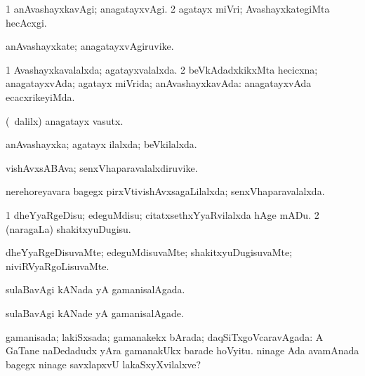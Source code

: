 \bentry
{} 
\gl{\kirxvi}
\expl{}
\bmng
\bnum
\num{1} anAvashayxkavAgi; anagatayxvAgi. 
\num{2} agatayx miVri; AvashayxkategiMta hecAcxgi. 
\enum
\emng
\eentry

\bentry
{} 
\gl{\nA}
\expl{}
\bmng
anAvashayxkate; anagatayxvAgiruvike. 
\emng
\eentry

\bentry
{} 
\gl{\gu}
\expl{}
\bmng
\bnum
\num{1} Avashayxkavalalxda; agatayxvalalxda. 
\num{2} beVkAdadxkikxMta hecicxna; anagatayxvAda; agatayx miVrida; anAvashayxkavAda:  anagatayxvAda ecacxrikeyiMda. 
\enum
\emng
\eentry

\bentry
{} 
\gl{\nA}
\bmng
(\sA\ \bava dalilx) anagatayx vasutx. 
\emng
\eentry

\bentry
{} 
\gl{\gu}
\bmng
anAvashayxka; agatayx ilalxda; beVkilalxda. 
\emng
\eentry

\bentry
{} 
\gl{\nA}
\expl{}
\bmng
vishAvxsABAva; senxVhaparavalalxdiruvike. 
\emng
\eentry

\bentry
{} 
\gl{\gu}
\expl{}
\bmng
nerehoreyavara bagegx pirxVtivishAvxsagaLilalxda; senxVhaparavalalxda. 
\emng
\eentry

\bentry
{} 
\gl{\sakirx}
\expl{}
\bmng
\bnum
\num{1} dheYyaRgeDisu; edeguMdisu; citatxsethxYyaRvilalxda hAge mADu. 
\num{2} (naragaLa) shakitxyuDugisu. 
\enum
\emng
\eentry

\bentry
{} 
\gl{\kirxvi}
\expl{}
\bmng
dheYyaRgeDisuvaMte; edeguMdisuvaMte; shakitxyuDugisuvaMte; niviRVyaRgoLisuvaMte. 
\emng
\eentry

\bentry
{} 
\gl{\gu}
\expl{}
\bmng
sulaBavAgi kANada yA gamanisalAgada. 
\emng
\eentry

\bentry
{} 
\gl{\kirxvi}
\expl{}
\bmng
sulaBavAgi kANade yA gamanisalAgade. 
\emng
\eentry

\bentry
{} 
\gl{\gu}
\expl{}
\bmng
gamanisada; lakiSxsada; gamanakekx bArada; daqSiTxgoVcaravAgada:  A GaTane naDedadudx yAra gamanakUkx barade hoVyitu.  ninage Ada avamAnada bagegx ninage savxlapxvU lakaSxyXvilalxve? 
\emng
\eentry

